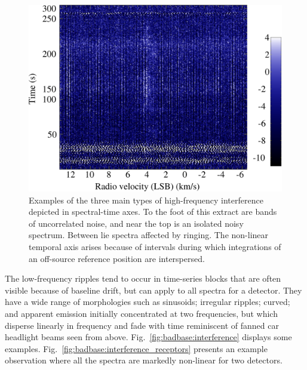 \documentclass[a4paper,fleqn,usenatbib]{mnras}
\begin{document}
\begin{figure}
\includegraphics[width=\columnwidth]{high_freq_three_types}
\caption{Examples of the three main types of high-frequency
  interference depicted in spectral-time axes.  To the foot of this extract
  are bands of uncorrelated noise, and near the top is an isolated
  noisy spectrum.  Between lie spectra affected by ringing.
  The non-linear temporal axis arises because of intervals during
  which integrations of an off-source reference position are interspersed.}
\label{fig:badbase:highfreq}
\end{figure}

The low-frequency ripples tend to occur in time-series blocks that are
often visible because of baseline drift, but can apply to all spectra
for a detector.  They have a wide range of morphologies such as
sinusoids; irregular ripples; curved; and apparent emission initially
concentrated at two frequencies, but which disperse linearly in
frequency and fade with time reminiscent of fanned car headlight
beams seen from above.
Fig.~\ref{fig:badbase:interference} displays some examples.
Fig.~\ref{fig:badbase:interference_receptors} presents an example
observation where all the spectra are markedly non-linear for two
detectors.
\end{document}
